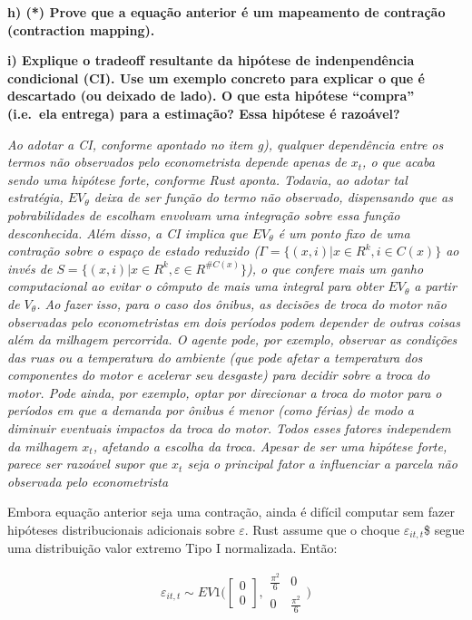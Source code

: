 \documentclass[12pt,a4paper]{article}
\begin{document}
\textbf{h) (*) Prove que a equação anterior é um mapeamento de contração
(contraction mapping).}

\textbf{i) Explique o tradeoff resultante da hipótese de indenpendência
condicional (CI). Use um exemplo concreto para explicar o que é
descartado (ou deixado de lado). O que esta hipótese ``compra''
(i.e.~ela entrega) para a estimação? Essa hipótese é razoável?}

\emph{Ao adotar a CI, conforme apontado no item g), qualquer dependência
entre os termos não observados pelo econometrista depende apenas de
\(x_t\), o que acaba sendo uma hipótese forte, conforme Rust aponta.
Todavia, ao adotar tal estratégia, \(EV_\theta\) deixa de ser função do
termo não observado, dispensando que as pobrabilidades de escolham
envolvam uma integração sobre essa função desconhecida. Além disso, a CI
implica que \(EV_\theta\) é um ponto fixo de uma contração sobre o
espaço de estado reduzido (\(\Gamma=\{(x,i)|x\in R^k, i \in C(x)\}\) ao
invés de \(S=\{(x,i)|x\in R^k, \varepsilon \in R^{\#C(x)}\}\)), o que
confere mais um ganho computacional ao evitar o cômputo de mais uma
integral para obter \(EV_\theta\) a partir de \(V_\theta\). Ao fazer
isso, para o caso dos ônibus, as decisões de troca do motor não
observadas pelo econometristas em dois períodos podem depender de outras
coisas além da milhagem percorrida. O agente pode, por exemplo, observar
as condições das ruas ou a temperatura do ambiente (que pode afetar a
temperatura dos componentes do motor e acelerar seu desgaste) para
decidir sobre a troca do motor. Pode ainda, por exemplo, optar por
direcionar a troca do motor para o períodos em que a demanda por ônibus
é menor (como férias) de modo a diminuir eventuais impactos da troca do
motor. Todos esses fatores independem da milhagem \(x_t\), afetando a
escolha da troca. Apesar de ser uma hipótese forte, parece ser razoável
supor que \(x_t\) seja o principal fator a influenciar a parcela não
observada pelo econometrista}

Embora equação anterior seja uma contração, ainda é difícil computar sem
fazer hipóteses distribucionais adicionais sobre \(\varepsilon\). Rust
assume que o choque \(\varepsilon_{it,t}\)\$ segue uma distribuição
valor extremo Tipo I normalizada. Então:

\[
\varepsilon_{it,t} \sim EV1 \Bigg( \begin{bmatrix} 
0   \\ 0 \end{bmatrix}, \begin{matrix} \frac{\pi^2}{6} & 0 \\ 0 & \frac{\pi^2}{6} \end{matrix} \Bigg) 
\]
\end{document}
